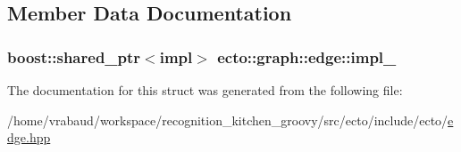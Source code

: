 \subsection{\-Member \-Data \-Documentation}
\hypertarget{structecto_1_1graph_1_1edge_a88b7d991f162cd009884c3061da8169d}{
\subsubsection[{impl\-\_\-}]{\setlength{\rightskip}{0pt plus 5cm}boost\-::shared\-\_\-ptr$<$impl$>$ {\bf ecto\-::graph\-::edge\-::impl\-\_\-}}}\label{structecto_1_1graph_1_1edge_a88b7d991f162cd009884c3061da8169d}


\-The documentation for this struct was generated from the following file\-:\begin{DoxyCompactItemize}
\item 
/home/vrabaud/workspace/recognition\-\_\-kitchen\-\_\-groovy/src/ecto/include/ecto/\hyperlink{edge_8hpp}{edge.\-hpp}\end{DoxyCompactItemize}

